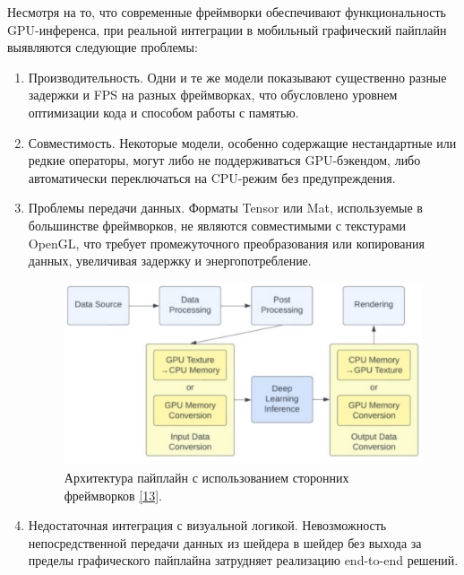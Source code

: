 \documentclass[a4paper,14pt]{extreport}
\begin{document}
            Несмотря на то, что современные фреймворки обеспечивают функциональность GPU-инференса, при реальной интеграции в мобильный графический пайплайн выявляются следующие проблемы:
            \begin{enumerate}
                \item Производительность. Одни и те же модели показывают существенно разные задержки и FPS на разных фреймворках, что обусловлено уровнем оптимизации кода и способом работы с памятью.
                \item Совместимость. Некоторые модели, особенно содержащие нестандартные или редкие операторы, могут либо не поддерживаться GPU-бэкендом, либо автоматически переключаться на CPU-режим без предупреждения.
                \item Проблемы передачи данных. Форматы Tensor или Mat, используемые в большинстве фреймворков, не являются совместимыми с текстурами OpenGL, что требует промежуточного преобразования или копирования данных, увеличивая задержку и энергопотребление.
                \begin{figure}[!h]
                    \begin{center}
                        \begin{minipage}[!h]{0.75\linewidth}
                            \includegraphics[width=1\linewidth]{images-pipeline/data.png}
                            \caption{Архитектура пайплайн с использованием сторонних фреймворков \hyperlink{[13]}{[13]}.}
                            \label{ris:netron}
                        \end{minipage}
                    \end{center}
                \end{figure}
                \item Недостаточная интеграция с визуальной логикой. Невозможность непосредственной передачи данных из шейдера в шейдер без выхода за пределы графического пайплайна затрудняет реализацию end-to-end решений.
            \end{enumerate}
\end{document}
